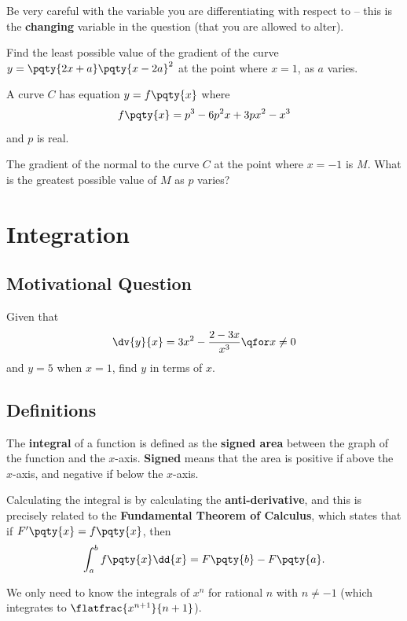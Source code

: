 \documentclass{article}
\begin{document}
Be very careful with the variable you are differentiating with respect to -- this is the \textbf{changing} variable in the question (that you are allowed to alter).

\begin{example}[TMUA 2016 P1 Q15]
    Find the least possible value of the gradient of the curve \(y = \pqty{2x + a} \pqty{x - 2a}^2\) at the point where \(x = 1\), as \(a\) varies.
\end{example}

\begin{example}[TMUA 2017 P1 Q10]
    A curve \(C\) has equation \(y = f\pqty{x}\) where
    \[
        f\pqty{x} = p^3 - 6 p^2 x + 3 p x^2 - x^3
    \]
    and \(p\) is real.

    The gradient of the normal to the curve \(C\) at the point where \(x = -1\) is \(M\). What is the greatest possible value of \(M\) as \(p\) varies?
\end{example}

\section{Integration}
\subsection{Motivational Question}

\begin{example}[TMUA 2017 P1 Q1]
    Given that
    \[
        \dv{y}{x} = 3 x^2 - \frac{2 - 3x}{x^3} \qfor x \neq 0
    \]
    and \(y = 5\) when \(x = 1\), find \(y\) in terms of \(x\).
\end{example}

\subsection{Definitions}

The \textbf{integral} of a function is defined as the \textbf{signed area} between the graph of the function and the \(x\)-axis. \textbf{Signed} means that the area is positive if above the \(x\)-axis, and negative if below the \(x\)-axis.

Calculating the integral is by calculating the \textbf{anti-derivative}, and this is precisely related to the \textbf{Fundamental Theorem of Calculus}, which states that if \(F'\pqty{x} = f\pqty{x}\), then
\[
    \int_{a}^{b} f\pqty{x} \dd{x} = F\pqty{b} - F\pqty{a}.
\]

We only need to know the integrals of \(x^n\) for rational \(n\) with \(n \neq -1\) (which integrates to \(\flatfrac{x^{n + 1}}{n + 1}\)).
\end{document}
